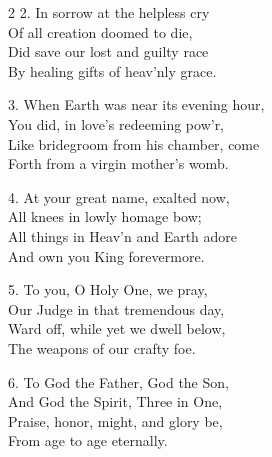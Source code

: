 \begin{multicols}{2}
    \small
2. In sorrow at the helpless cry\\
Of all creation doomed to die,\\
Did save our lost and guilty race\\
By healing gifts of heav'nly grace.

3. When Earth was near its evening hour,\\
You did, in love’s redeeming pow’r,\\
Like bridegroom from his chamber, come\\
Forth from a virgin mother’s womb.

4. At your great name, exalted now,\\
All knees in lowly homage bow;\\
All things in Heav’n and Earth adore\\
And own you King forevermore.

5. To you, O Holy One, we pray,\\
Our Judge in that tremendous day,\\
Ward off, while yet we dwell below,\\
The weapons of our crafty foe.

6. To God the Father, God the Son,\\
And God the Spirit, Three in One,\\
Praise, honor, might, and glory be,\\
From age to age eternally.

\end{multicols}